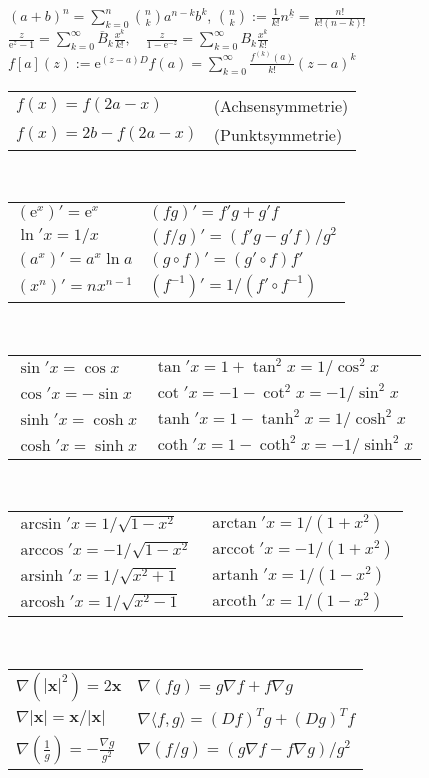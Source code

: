 \documentclass[a4paper,10pt,fleqn,twoside,twocolumn]{scrartcl}
\newcommand{\ee}{\mathrm e}
\newcommand{\ds}{\displaystyle}
\newcommand{\arccot}{\operatorname{arccot}}
\newcommand{\arsinh}{\operatorname{arsinh}}
\newcommand{\arcosh}{\operatorname{arcosh}}
\newcommand{\artanh}{\operatorname{artanh}}
\newcommand{\arcoth}{\operatorname{arcoth}}
\begin{document}
$\ds (a+b)^n = {\textstyle\sum\limits_{k=0}^n} \binom{n}{k}a^{n-k} b^k$,\quad
$\ds\binom{n}{k} := \frac{1}{k!}n^{\underline k} = \frac{n!}{k!(n-k)!}$\\
$\ds\frac{z}{\ee^z-1} = {\textstyle\sum\limits_{k=0}^\infty} \overline B_k \frac{x^k}{k!},\quad
\ds\frac{z}{1-\ee^{-z}} = {\textstyle\sum\limits_{k=0}^\infty} B_k\frac{x^k}{k!}$\\
$\ds f[a](z) := \ee^{(z-a)D}f(a) = {\textstyle\sum\limits_{k=0}^\infty} \frac{f^{(k)}(a)}{k!}(z-a)^k$\\
\begin{tabular}{@{}ll}
$f(x)=f(2a-x)$ & (Achsensymmetrie)\\
$f(x)=2b-f(2a-x)$ & (Punktsymmetrie)
\end{tabular}\\
\begin{tabular}{@{}l|l}
$(\ee^x)' = \ee^x$ & $(fg)'=f'g+g'f$\\
$\ln' x = 1/x$ & $(f/g)'=(f'g-g'f)/g^2$\\
$(a^x)' = a^x\ln a$ & $(g\circ f)' = (g'\circ f)f'$\\
$(x^n)' = nx^{n-1}$ & $(f^{-1})' = 1/(f'\circ f^{-1})$
\end{tabular}\\
\begin{tabular}{@{}l|l}
$\sin'x = \cos x$ & $\tan'x = 1+\tan^2 x = 1/\cos^2 x$\\
$\cos'x = -\sin x$ & $\cot'x = -1-\cot^2 x = -1/\sin^2 x$\\
$\sinh'x = \cosh x$ & $\tanh'x = 1-\tanh^2 x = 1/\cosh^2 x$\\
$\cosh'x = \sinh x$ & $\coth'x = 1-\coth^2 x = -1/\sinh^2 x$
\end{tabular}\\
\begin{tabular}{@{}l|l}
$\arcsin'x = 1/\sqrt{1-x^2}$ & $\arctan'x = 1/(1+x^2)$\\
$\arccos'x = -1/\sqrt{1-x^2}$ & $\arccot'x = -1/(1+x^2)$\\ 
$\arsinh'x = 1/\sqrt{x^2+1}$ & $\artanh'x = 1/(1-x^2)$\\
$\arcosh'x = 1/\sqrt{x^2-1}$ & $\arcoth'x = 1/(1-x^2)$
\end{tabular}\\
\begin{tabular}{@{}l|l}
$\nabla(|\mathbf x|^2) = 2\mathbf x$ & $\nabla (fg) = g\nabla f+f\nabla g$\\
$\nabla |\mathbf x| = \mathbf x/|\mathbf x|$ & $\nabla\langle f,g\rangle = (Df)^T g+(Dg)^T f$\\
$\nabla (\tfrac{1}{g}) = -\frac{\nabla g}{g^2}$
& $\nabla(f/g) = (g\nabla f-f\nabla g)/g^2$
\end{tabular}\\
\end{document}
